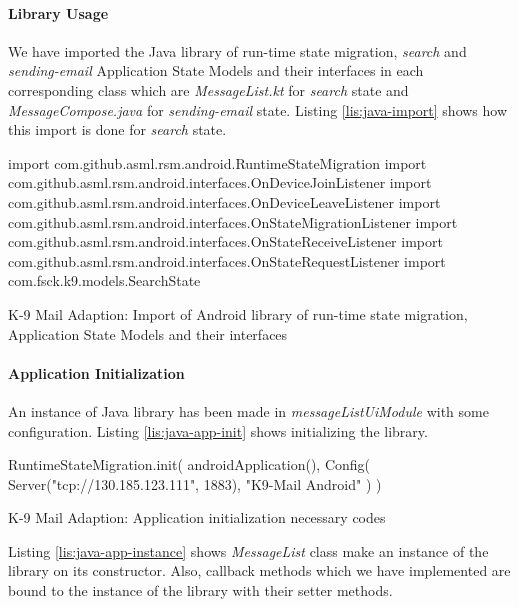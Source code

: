 
\paragraph{Library Usage}
We have imported the Java library of run-time state migration, \textit{search} and \textit{sending-email} Application State Models and their interfaces in each corresponding class which are \textit{MessageList.kt} for \textit{search} state and \textit{MessageCompose.java} for \textit{sending-email} state. Listing \ref{lis:java-import} shows how this import is done for \textit{search} state.

\FloatBarrier
\begin{code}
\begin{javas}
import com.github.asml.rsm.android.RuntimeStateMigration
import com.github.asml.rsm.android.interfaces.OnDeviceJoinListener
import com.github.asml.rsm.android.interfaces.OnDeviceLeaveListener
import com.github.asml.rsm.android.interfaces.OnStateMigrationListener
import com.github.asml.rsm.android.interfaces.OnStateReceiveListener
import com.github.asml.rsm.android.interfaces.OnStateRequestListener
import com.fsck.k9.models.SearchState
\end{javas}
\caption{K-9 Mail Adaption: Import of Android library of run-time state migration, Application State Models and their interfaces}
\label{lis:java-import}
\end{code}
\FloatBarrier

\paragraph{Application Initialization}
An instance of Java library has been made in \textit{messageListUiModule} with some configuration. Listing \ref{lis:java-app-init} shows initializing the library.

\FloatBarrier
\begin{code}
\begin{java}
RuntimeStateMigration.init(
        androidApplication(),
        Config(
            Server("tcp://130.185.123.111", 1883),
            "K9-Mail Android"
        )
)
\end{java}
\caption{K-9 Mail Adaption: Application initialization necessary codes}
\label{lis:java-app-init}
\end{code}
\FloatBarrier

Listing \ref{lis:java-app-instance} shows \textit{MessageList} class make an instance of the library on its constructor. Also, callback methods which we have implemented are bound to the instance of the library with their setter methods. 

